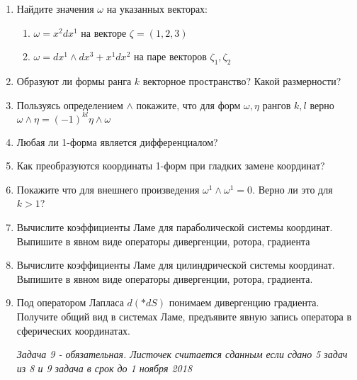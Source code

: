 \documentclass{article}
\begin{document}
\begin{enumerate}
    \item Найдите значения $\omega$ на указанных векторах:
    \begin{enumerate}
        \item $\omega = x^2 dx^1$ на векторе $\zeta = (1,2,3)$
        \item $\omega = d x^1 \wedge d x^3 + x^1 dx^2 $ на паре векторов $\zeta_1, \zeta_2$
    \end{enumerate}
    \item Образуют ли формы ранга $k$ векторное пространство? Какой размерности?
    \item Пользуясь определением $\wedge$ покажите, что для форм $\omega, \eta$ рангов $k,l$ верно $\omega \wedge \eta = (-1)^{kl} \eta \wedge \omega$
    \item Любая ли 1-форма является дифференциалом? 
    \item Как преобразуются координаты 1-форм при гладких замене координат?
    \item Покажите что для внешнего произведения $\omega^1 \wedge \omega^1 = 0$. Верно ли это для $k>1$?
    \item Вычислите коэффициенты Ламе для параболической системы координат. Выпишите в явном виде операторы дивергенции, ротора, градиента
    \item Вычислите коэффициенты Ламе для цилиндрической системы координат. Выпишите в явном виде операторы дивергенции, ротора, градиента.
    \item Под оператором Лапласа $d(*dS)$ понимаем дивергенцию градиента. Получите общий вид в системах Ламе, предъявите явную запись оператора в сферических координатах.

\vspace{\fill}
\textit{Задача 9 - обязательная. Листочек считается сданным если сдано 5 задач из 8 и 9 задача в срок до 1 ноября 2018}

\end{enumerate}
\end{document}
